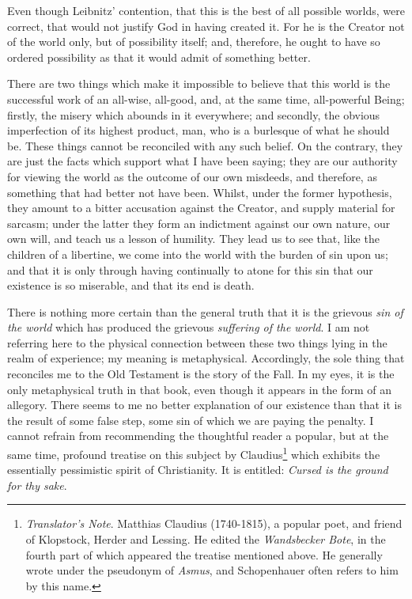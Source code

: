 Even though Leibnitz' contention, that this is the best of all
possible worlds, were correct, that would not justify God in having
created it. For he is the Creator not of the world only, but of
possibility itself; and, therefore, he ought to have so ordered
possibility as that it would admit of something better.

There are two things which make it impossible to believe that
this world is the successful work of an all-wise, all-good, and, at
the same time, all-powerful Being; firstly, the misery which abounds
in it everywhere; and secondly, the obvious imperfection of its
highest product, man, who is a burlesque of what he should be. These
things cannot be reconciled with any such belief. On the contrary,
they are just the facts which support what I have been saying; they
are our authority for viewing the world as the outcome of our own
misdeeds, and therefore, as something that had better not have been.
Whilst, under the former hypothesis, they amount to a bitter
accusation against the Creator, and supply material for sarcasm; under
the latter they form an indictment against our own nature, our own
will, and teach us a lesson of humility. They lead us to see that,
like the children of a libertine, we come into the world with the
burden of sin upon us; and that it is only through having continually
to atone for this sin that our existence is so miserable, and that its
end is death.

There is nothing more certain than the general truth that it is the
grievous \textit{sin of the world} which has produced the grievous
\textit{suffering of the world}. I am not referring here to the
physical connection between these two things lying in the realm of
experience; my meaning is metaphysical. Accordingly, the sole thing
that reconciles me to the Old Testament is the story of the Fall. In
my eyes, it is the only metaphysical truth in that book, even though
it appears in the form of an allegory. There seems to me no 
better explanation of our existence than that it is the result of some
false step, some sin of which we are paying the penalty. I cannot
refrain from recommending the thoughtful reader a popular, but at the
same time, profound treatise on this subject by
Claudius\footnote{\textit{Translator's Note}. Matthias Claudius
(1740-1815), a popular poet, and friend of Klopstock, Herder and
Lessing. He edited the \textit{Wandsbecker Bote}, in the fourth part
of which appeared the treatise mentioned above. He generally wrote
under the pseudonym of \textit{Asmus}, and Schopenhauer often refers
to him by this name.} which exhibits the essentially pessimistic
spirit of Christianity. It is entitled: \textit{Cursed is the ground
for thy sake}.

